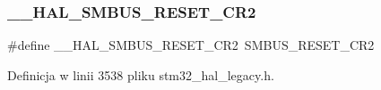 \subsubsection{\texorpdfstring{\+\_\+\+\_\+\+H\+A\+L\+\_\+\+S\+M\+B\+U\+S\+\_\+\+R\+E\+S\+E\+T\+\_\+\+C\+R2}{\_\_HAL\_SMBUS\_RESET\_CR2}}
{\footnotesize\ttfamily \#define \+\_\+\+\_\+\+H\+A\+L\+\_\+\+S\+M\+B\+U\+S\+\_\+\+R\+E\+S\+E\+T\+\_\+\+C\+R2~S\+M\+B\+U\+S\+\_\+\+R\+E\+S\+E\+T\+\_\+\+C\+R2}



Definicja w linii 3538 pliku stm32\+\_\+hal\+\_\+legacy.\+h.

